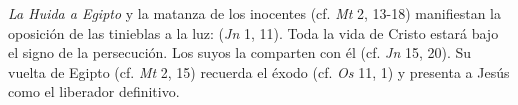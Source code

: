 	 \emph{La Huida a Egipto} y la matanza de los inocentes (cf. \emph{Mt} 2, 13-18) manifiestan la oposición de las tinieblas a la luz:  (\emph{Jn} 1, 11). Toda la vida de Cristo estará bajo el signo de la persecución. Los suyos la comparten con él (cf. \emph{Jn} 15, 20). Su vuelta de Egipto (cf. \emph{Mt} 2, 15) recuerda el éxodo (cf. \emph{Os} 11, 1) y presenta a Jesús como el liberador definitivo.